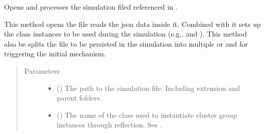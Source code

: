 \documentclass[letterpaper,10pt,english]{sphinxmanual}
\begin{document}
\begin{fulllineitems}
\begin{fulllineitems}
\begin{quote}
\begin{description}
\end{description}\end{quote}

\end{fulllineitems}


\begin{fulllineitems}
\label{\detokenize{app.domain:app.domain.master_servers.Master._process_simfile}}
Opens and processes the simulation filed referenced in .

This method opens the file reads the json data inside it. Combined
with {\hyperref[\detokenize{app:module-app.environment_settings}]{}} it sets up the class
instances to be used during the simulation (e.g.,
{\hyperref[\detokenize{app.domain:app.domain.cluster_groups.Cluster}]{}} and
{\hyperref[\detokenize{app.domain:app.domain.network_nodes.Node}]{}}). This
method also be splits the file to be persisted in the simulation into
multiple  or  and for triggering the initial
{\hyperref[\detokenize{app.domain:app.domain.cluster_groups.Cluster.spread_files}]{}} mechanism.
\begin{quote}\begin{description}
\item[{Parameters}] \leavevmode\begin{itemize}
\item {} 
 () \textendash{} The path to the simulation file. Including extension and
parent folders.

\item {} 
 () \textendash{} The name of the class used to instantiate cluster group
instances through reflection.
See {\hyperref[\detokenize{app.domain:module-app.domain.cluster_groups}]{}}.


\end{itemize}
\end{description}
\end{quote}
\end{fulllineitems}
\end{fulllineitems}
\end{document}
